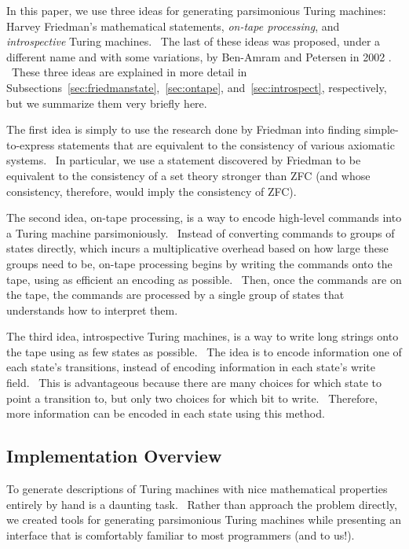 \documentclass[11pt]{article}
\begin{document}
In this paper, we use three ideas for generating parsimonious Turing machines: Harvey Friedman's mathematical statements, \emph{on-tape processing}, and \emph{introspective} Turing machines. \ The last of these ideas was proposed, under a different name and with some variations, by Ben-Amram and Petersen in 2002 \cite{benamram}. \ These three ideas are explained in more detail in Subsections~\ref{sec:friedmanstate},~\ref{sec:ontape}, and~\ref{sec:introspect}, respectively, but we summarize them very briefly here.

The first idea is simply to use the research done by Friedman into finding simple-to-express statements that are equivalent to the consistency of various axiomatic systems. \ In particular, we use a statement discovered by Friedman to be equivalent to the consistency of a set theory stronger than ZFC (and whose consistency, therefore, would imply the consistency of ZFC).~\cite{friedman}

The second idea, on-tape processing, is a way to encode high-level commands into a Turing machine parsimoniously. \ Instead of converting commands to groups of states directly, which incurs a multiplicative overhead based on how large these groups need to be, on-tape processing begins by writing the commands onto the tape, using as efficient an encoding as possible. \ Then, once the commands are on the tape, the commands are processed by a single group of states that understands how to interpret them.

The third idea, introspective Turing machines, is a way to write long strings onto the tape using as few states as possible. \ The idea is to encode information one of each state's transitions, instead of encoding information in each state's write field. \ This is advantageous because there are many choices for which state to point a transition to, but only two choices for which bit to write. \ Therefore, more information can be encoded in each state using this method.

\subsection{Implementation Overview}

To generate descriptions of Turing machines with nice mathematical properties entirely by hand is a daunting task. \ Rather than approach the problem directly, we created tools for generating parsimonious Turing machines while presenting an interface that is comfortably familiar to most programmers (and to us!).
\end{document}
